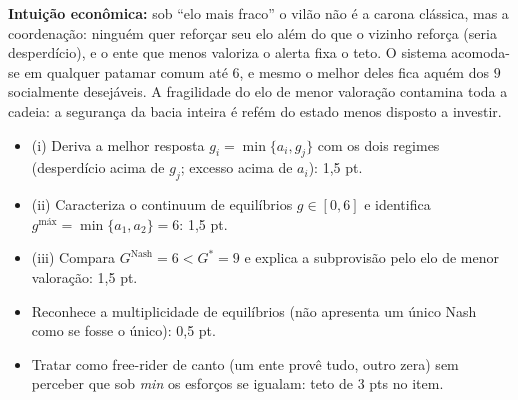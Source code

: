 \begin{solucao}
\textbf{Intuição econômica:} sob ``elo mais fraco'' o vilão não é a carona clássica, mas a coordenação: ninguém quer reforçar seu elo além do que o vizinho reforça (seria desperdício), e o ente que menos valoriza o alerta fixa o teto. O sistema acomoda-se em qualquer patamar comum até $6$, e mesmo o melhor deles fica aquém dos $9$ socialmente desejáveis. A fragilidade do elo de menor valoração contamina toda a cadeia: a segurança da bacia inteira é refém do estado menos disposto a investir.
\rubricalabel
\begin{itemize}
\item (i) Deriva a melhor resposta $g_i=\min\{a_i,g_j\}$ com os dois regimes (desperdício acima de $g_j$; excesso acima de $a_i$): 1{,}5 pt.
\item (ii) Caracteriza o continuum de equilíbrios $g\in[0,6]$ e identifica $g^{\text{máx}}=\min\{a_1,a_2\}=6$: 1{,}5 pt.
\item (iii) Compara $G^{\text{Nash}}=6<G^{*}=9$ e explica a subprovisão pelo elo de menor valoração: 1{,}5 pt.
\item Reconhece a multiplicidade de equilíbrios (não apresenta um único Nash como se fosse o único): 0{,}5 pt.
\item Tratar como free-rider de canto (um ente provê tudo, outro zera) sem perceber que sob \emph{min} os esforços se igualam: teto de 3 pts no item.
\end{itemize}
\end{solucao}


